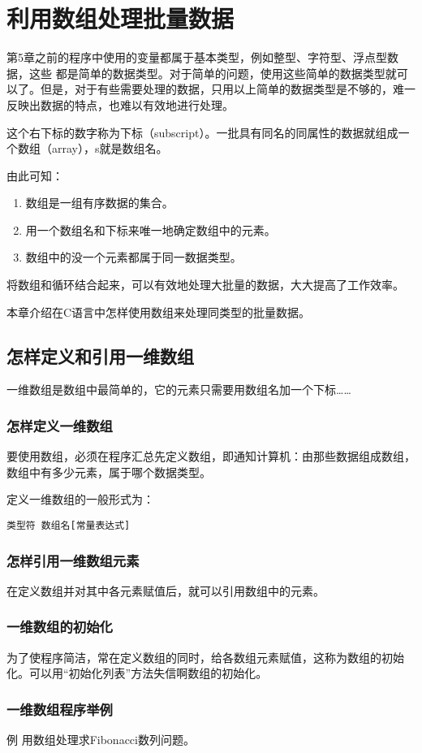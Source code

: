 \chapter{利用数组处理批量数据}
第5章之前的程序中使用的变量都属于基本类型，例如整型、字符型、浮点型数据，这些 都是简单的数据类型。对于简单的问题，使用这些简单的数据类型就可以了。但是，对于有些需要处理的数据，只用以上简单的数据类型是不够的，难一反映出数据的特点，也难以有效地进行处理。

这个右下标的数字称为下标（subscript）。一批具有同名的同属性的数据就组成一个数组（array），s就是数组名。

由此可知：
\begin{enumerate}
	\item 数组是一组有序数据的集合。
	\item 用一个数组名和下标来唯一地确定数组中的元素。
	\item 数组中的没一个元素都属于同一数据类型。
\end{enumerate}

将数组和循环结合起来，可以有效地处理大批量的数据，大大提高了工作效率。

本章介绍在C语言中怎样使用数组来处理同类型的批量数据。
\section{怎样定义和引用一维数组}
一维数组是数组中最简单的，它的元素只需要用数组名加一个下标……
\subsection{怎样定义一维数组}
要使用数组，必须在程序汇总先定义数组，即通知计算机：由那些数据组成数组，数组中有多少元素，属于哪个数据类型。

定义一维数组的一般形式为：
\begin{lstlisting}
类型符 数组名[常量表达式]
\end{lstlisting}
\subsection{怎样引用一维数组元素}
在定义数组并对其中各元素赋值后，就可以引用数组中的元素。
\subsection{一维数组的初始化}
为了使程序简洁，常在定义数组的同时，给各数组元素赋值，这称为数组的初始化。可以用“初始化列表”方法失信啊数组的初始化。
\subsection{一维数组程序举例}
例 用数组处理求Fibonacci数列问题。
